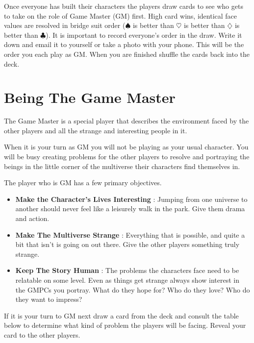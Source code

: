 \documentclass[letterpaper,12pt,landscape,twocolumn]{book}
\begin{document}
Once everyone has built their characters the players draw cards
to see who gets to take on the role of Game Master (GM) first. High
card wins, identical face values are resolved in bridge suit order
($\spadesuit$ is better than $\heartsuit$ is better than
$\diamondsuit$ is better than $\clubsuit$). It is important to record
everyone's order in the draw. Write it down and email it to yourself
or take a photo with your phone. This will be the order you each play
as GM. 
When you are finished shuffle the cards back into the deck.

\section{Being The Game Master}

The Game Master is a special player that describes the environment
faced by the other players and all the strange and interesting people
in it. 

When it is your turn as GM you will not be playing as your usual
character. You will be busy creating problems for the other players to
resolve and portraying the beings in the little corner of the
multiverse their characters find themselves in.

The player who is GM has a few primary objectives. 

\begin{itemize}
\item \textbf{Make the Character's Lives Interesting} : Jumping from
  one universe to another should never feel like a leisurely walk in
  the park. Give them drama and action.
\item \textbf{Make The Multiverse Strange} : Everything that is
  possible, and quite a bit that isn't is going on out there. Give
  the other players something truly strange.
\item \textbf{Keep The Story Human} : The problems the characters
  face need to be relatable on some level. Even as things get
  strange always show interest in the GMPCs you portray. What do
  they hope for? Who do they love? Who do they want to impress?
\end{itemize}

If it is your turn to GM next draw a card from the deck and consult
the table below to determine what kind of problem the players will be
facing. Reveal your card to the other players. \\
\end{document}
